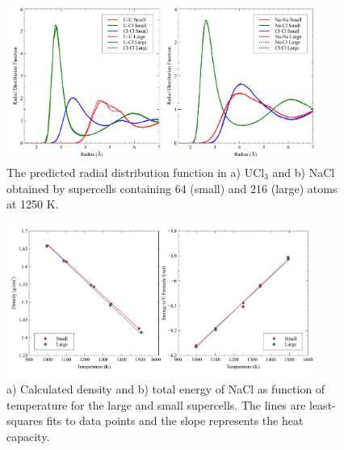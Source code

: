 \documentclass[preprint,3p,10pt,onecolumn,number,sort&compress]{elsarticle}
\begin{document}
{\begin{figure}[htb]
\centering
\includegraphics[width=0.9\textwidth]{fig1.pdf}
\caption{The predicted radial distribution function in a) UCl$_3$ and b) NaCl obtained by supercells containing 64 (small) and 216 (large) atoms at 1250 K.} 
\label{fig:radial}
\end{figure}

\begin{figure}[htb]
\centering
\includegraphics[width=0.9\textwidth]{fig2.pdf}
\caption{a) Calculated density and b) total energy of NaCl as function of temperature for the large and small supercells. The lines are least-squares fits to data points and the slope represents the heat capacity.} 
\label{fig:NaClsize}
\end{figure}
}
\end{document}
